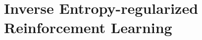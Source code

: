 \documentclass{article}
\theoremstyle{definition}
\theoremstyle{remark}
\theoremstyle{plain}
\numberwithin{equation}{section}
\begin{document}


\section{Inverse Entropy-regularized Reinforcement Learning}
\label{sec:irl}
\end{document}
